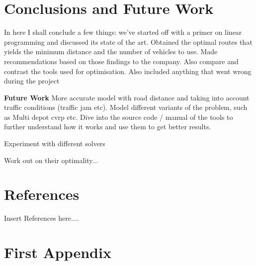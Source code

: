 \documentclass[a4paper, 12pt]{report}
\begin{document}
\chapter{Conclusions and Future Work}
In here I shall conclude a few things: we've started off with a primer on linear programming and discussed its state
 of the art. Obtained the optimal routes that yields the minimum distance and the number of vehicles to use. Made
 recommendations based on those findings to the company. Also compare and contrast the tools used for optimisation. Also
 included anything that went wrong during the project

\textbf{Future Work}
More accurate model with road distance and taking into account traffic conditions (traffic jam etc). Model
 different variants of the problem, such as Multi depot cvrp etc. Dive into the source  code / manual of
 the tools to further understand how it works and use them to get better results.

 Experiment with different solvers

 Work out on their optimality...

\chapter{References}
Insert References here....

\appendix
\chapter{First Appendix}
\end{document}
